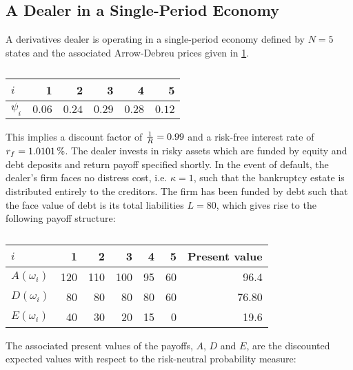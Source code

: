 \documentclass[main.tex]{subfiles}
\begin{document}
    \subsection{A Dealer in a Single-Period Economy}

    A derivatives dealer is operating in a single-period economy
    defined by $N=5$ states and the associated Arrow-Debreu prices given in \cref{tbl:example-firm-structure}.
        \begin{table}[H]
            \centering
            \begin{tabular}{l|rrrrr}
                $i$ & 1 & 2 & 3 & 4 & 5 \\
                \hline
                $\psi_{i}$ & $\num{0.06}$ & $\num{0.24}$ & $\num{0.29}$ & $\num{0.28}$ & $\num{0.12}$ \\
            \end{tabular}
            \caption{}
            \label{tbl:example-firm-structure}
        \end{table}
    This implies a discount factor of $\frac{1}{R} = \num{0.99}$ and a risk-free interest rate of $\rfrate = \pct{0.010101}$.
    The dealer invests in risky assets 
    which are funded by equity and debt deposits and return payoff specified shortly.
    In the event of default, the dealer's firm faces no distress cost, i.e. $\kappa = 1$, 
    such that the bankruptcy estate is distributed entirely to the creditors.
    The firm has been funded by debt such that the face value of debt is its total liabilities $L=\num{80}$, 
    which gives rise to the following payoff structure:
    \begin{table}[H]
        \centering
        \begin{tabular}{l|rrrrr||r}
            $i$ & 1 & 2 & 3 & 4 & 5 & Present value \\
            \hline
            $A(\omega_{i})$ & \num{120} & \num{110} & \num{100} & \num{95} & \num{60} & \num{96.4} \\
            $D(\omega_{i})$ & \num{80} & \num{80} & \num{80} & \num{80} & \num{60} & \num{76.80}\\
            $E(\omega_{i})$ & \num{40} & \num{30} & \num{20} & \num{15} & \num{0} & \num{19.6}
        \end{tabular}
        \caption{}
        \label{tbl:example-pre-project-capital-structure}
    \end{table}
    The associated present values of the payoffs, $A$, $D$ and $E$, 
    are the discounted expected values
    with respect to the risk-neutral probability measure:
\end{document}
